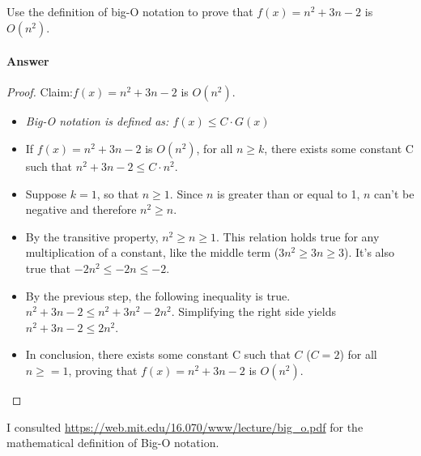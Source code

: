 \documentclass{article}
\begin{document}
Use the definition of big-O notation to prove that $f(x)=n^2 + 3n -2$ is
$O(n^2)$.

\paragraph{Answer}
\begin{proof}{Claim:}{$f(x)=n^2 + 3n -2$ is $O(n^2)$.} 
\begin{itemize}
\item \emph{Big-O notation is defined as: $f(x) \leq C\cdot{G(x)}$}
\item { If $f(x)=n^2 + 3n - 2$ is $O(n^2)$, for all $n \geq k$, there exists some constant C such that $n^2 + 3n - 2 \leq C\cdot{n^2}$.}
\item{Suppose $k = 1$, so that $n \geq 1.$ Since $n$ is greater than or equal to 1, $n$ can't be negative and therefore $n^2 \geq n$.}
\item{By the transitive property, $n^2 \geq n \geq 1$. This relation holds true for any multiplication of a constant, like the middle term ($3n^2 \geq 3n \geq 3$). It's also true that $-2n^2 \leq -2n \leq -2.$}
\item{By the previous step, the following inequality is true. $n^2 + 3n - 2 \leq n^2 + 3n^2 - 2n^2.$ Simplifying the right side yields $n^2 + 3n - 2 \leq 2n^2.$}
\item{In conclusion, there exists some constant C such that $C$ ($C = 2$) for all $n \geq = 1$, proving that $f(x)=n^2 + 3n -2$ is $O(n^2)$.}
\end{itemize}
\end{proof}

I consulted \url{https://web.mit.edu/16.070/www/lecture/big_o.pdf} for the mathematical definition of Big-O notation. 
\end{document}
